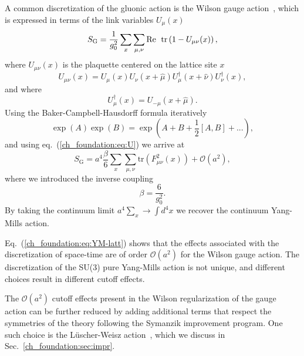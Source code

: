A common discretization of the gluonic action is the Wilson gauge action~\citep{Wilson:1974sk}, which is expressed in terms of the link variables $U_{\mu}(x)$
\begin{equation}
\label{ch_foundation:eq:SG}
S_{\textrm{G}}=\frac{1}{g_0^2}\sum_x\sum_{\mu,\nu}{\textrm{Re\; tr}}\left(1-U_{\mu\nu}(x)\right),
\end{equation} 
where $U_{\mu\nu}(x)$ is the plaquette centered on the lattice site $x$
\begin{equation}
\label{ch_foundation:eq:plaq}
U_{\mu\nu}(x)=U_{\mu}(x)U_{\nu}(x+\hat{\mu})U_{\mu}^{\dagger}(x+\hat{\nu})U_{\nu}^{\dagger}(x),
\end{equation}
and where
\begin{equation}
U_{\mu}^{\dagger}(x)=U_{-\mu}(x+\hat{\mu}).
\end{equation}
Using the Baker-Campbell-Hausdorff formula iteratively
\begin{equation}
\exp\left(A\right)\exp\left(B\right)=\exp\left(A+B+\frac{1}{2}\left[A,B\right]+...\right),
\end{equation}
and using eq.~(\ref{ch_foundation:eq:U}) we arrive at
\begin{equation}
\label{ch_foundation:eq:YM-latt}
S_{\textrm{G}}=a^4\frac{\beta}{6}\sum_x\sum_{\mu,\nu}{\textrm{tr}}\left(F_{\mu\nu}^2(x)\right)+\mathcal{O}(a^2),
\end{equation}
where we introduced the inverse coupling
\begin{equation}
\beta=\frac{6}{g_0^2}.
\end{equation}
By taking the continuum limit $a^4\sum_x\rightarrow\int d^4x$ we recover the continuum Yang-Mills action.

Eq.~(\ref{ch_foundation:eq:YM-latt}) shows that the effects associated with the discretization of space-time are of order $\mathcal{O}(a^2)$ for the Wilson gauge action. The discretization of the SU(3) pure Yang-Mills action is not unique, and different choices result in different cutoff effects.

The $\mathcal{O}(a^2)$ cutoff effects present in the Wilson regularization of the gauge action can be further reduced by adding additional terms that respect the symmetries of the theory following the Symanzik improvement program. One such choice is the Lüscher-Weisz action~\citep{Luscher:1984xn}, which we discuss in Sec.~\ref{ch_foundation:sec:impr}.



